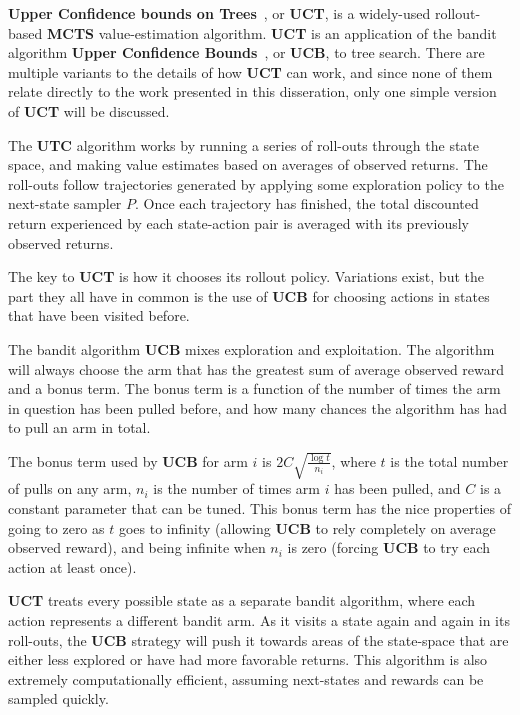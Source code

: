 {\bf Upper Confidence bounds on Trees}~\cite{kocsis06}, or {\bf UCT}, is a widely-used rollout-based {\bf MCTS} value-estimation algorithm. {\bf UCT} is an application of the bandit algorithm {\bf Upper Confidence Bounds}~\cite{auer02}, or {\bf UCB}, to tree search. There are multiple variants to the details of how {\bf UCT} can work, and since none of them relate directly to the work presented in this disseration, only one simple version of {\bf UCT} will be discussed.

The {\bf UTC} algorithm works by running a series of roll-outs through the state space, and making value estimates based on averages of observed returns. The roll-outs follow trajectories generated by applying some exploration policy to the next-state sampler $P$. Once each trajectory has finished, the total discounted return experienced by each state-action pair is averaged with its previously observed returns.

The key to {\bf UCT} is how it chooses its rollout policy. Variations exist, but the part they all have in common is the use of {\bf UCB} for choosing actions in states that have been visited before.

The bandit algorithm {\bf UCB} mixes exploration and exploitation. The algorithm will always choose the arm that has the greatest sum of average observed reward and a bonus term. The bonus term is a function of the number of times the arm in question has been pulled before, and how many chances the algorithm has had to pull an arm in total.

The bonus term used by {\bf UCB} for arm $i$ is $2 C \sqrt{\frac{\log t}{n_i}}$, where $t$ is the total number of pulls on any arm, $n_i$ is the number of times arm $i$ has been pulled, and $C$ is a constant parameter that can be tuned. This bonus term has the nice properties of going to zero as $t$ goes to infinity (allowing {\bf UCB} to rely completely on average observed reward), and being infinite when $n_i$ is zero (forcing {\bf UCB} to try each action at least once).


{\bf UCT} treats every possible state as a separate bandit algorithm, where each action represents a different bandit arm. As it visits a state again and again in its roll-outs, the {\bf UCB} strategy will push it towards areas of the state-space that are either less explored or have had more favorable returns. This algorithm is also extremely computationally efficient, assuming next-states and rewards can be sampled quickly.

